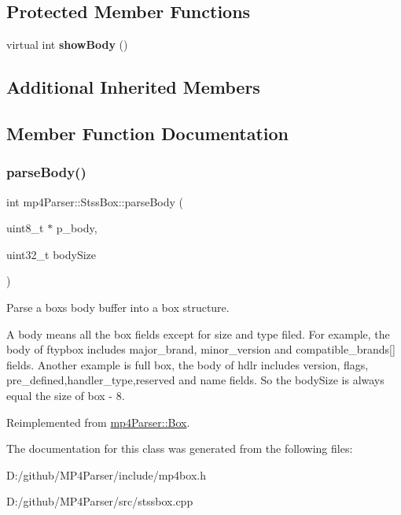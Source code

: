\subsection*{Protected Member Functions}
\begin{DoxyCompactItemize}
\item 
\mbox{\label{classmp4_parser_1_1_stss_box_a64c3f5dbe47b8464dbd8ca8058972838}} 
virtual int {\bfseries show\+Body} ()
\end{DoxyCompactItemize}
\subsection*{Additional Inherited Members}


\subsection{Member Function Documentation}
\mbox{\label{classmp4_parser_1_1_stss_box_a1d6de5d79b6d67ffc2ae30dd6c1f9b67}} 
\subsubsection{\texorpdfstring{parseBody()}{parseBody()}}
{\footnotesize\ttfamily int mp4\+Parser\+::\+Stss\+Box\+::parse\+Body (\begin{DoxyParamCaption}\item[{uint8\+\_\+t $\ast$}]{p\+\_\+body,  }\item[{uint32\+\_\+t}]{body\+Size }\end{DoxyParamCaption})\hspace{0.3cm}{\ttfamily [virtual]}}



Parse a box\textquotesingle{}s body buffer into a box structure. 

A body means all the box fields except for size and type filed. For example, the body of ftypbox includes major\+\_\+brand, minor\+\_\+version and compatible\+\_\+brands\mbox{[}\mbox{]} fields. Another example is full box, the body of hdlr includes version, flags, pre\+\_\+defined,handler\+\_\+type,reserved and name fields. So the body\+Size is always equal the size of box -\/ 8. 

Reimplemented from \mbox{\hyperlink{classmp4_parser_1_1_box_a3dd0c084ac65bc77b69ac5ecaf796cb2}{mp4\+Parser\+::\+Box}}.



The documentation for this class was generated from the following files\+:\begin{DoxyCompactItemize}
\item 
D\+:/github/\+M\+P4\+Parser/include/mp4box.\+h\item 
D\+:/github/\+M\+P4\+Parser/src/stssbox.\+cpp\end{DoxyCompactItemize}
